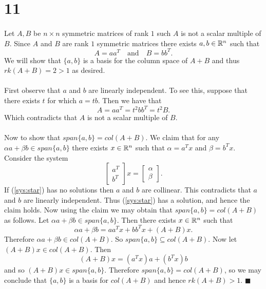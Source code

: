 \documentclass[letterpaper,12pt,oneside,onecolumn]{article}
\begin{document}
\section*{11}
\paragraph{}
Let $A, B$ be $n \times n$ symmetric matrices of rank $1$ such $A$ is not a scalar multiple of $B$. Since $A$ and $B$ are rank $1$ symmetric matrices there exists $a, b \in \mathbb{R}^n$ such that $$A = aa^T \quad \text{and}\quad B = bb^T.$$
We will show that $\{a,b\}$ is a basis for the column space of $A+B$ and thus $rk(A+B) = 2 > 1$ as desired.
\paragraph{}
First observe that $a$ and $b$ are linearly independent. To see this, suppose that there exists $t$ for which $a = tb$. Then we have that $$A = aa^T = t^2bb^T = t^2B.$$
Which contradicts that $A$ is not a scalar multiple of $B$.
\paragraph{}
Now to show that $span\{a,b\} = col(A+B)$. We claim that for any $\alpha a + \beta b \in span \{a,b\}$ there exists $x \in \mathbb{R}^n$ such that $\alpha = a^Tx$ and $\beta = b^Tx$. Consider the system
\begin{equation} \begin{bmatrix} a^T \\b^T\end{bmatrix} x = \begin{bmatrix}\alpha \\ \beta\end{bmatrix}. \label{sys:star}\end{equation}
If (\ref{sys:star}) has no solutions then $a$ and $b$ are collinear. This contradicts that $a$ and $b$ are linearly independent. Thus (\ref{sys:star}) has a solution, and hence the claim holds. Now using the claim we may obtain that $span\{a,b\} = col(A+B)$ as follows. Let $\alpha a + \beta b \in span\{a,b\}$. Then there exists $x \in \mathbb{R}^n$ such that $$\alpha a + \beta b = aa^Tx + bb^Tx + (A+B)x.$$
Therefore $\alpha a + \beta b \in col(A+B)$. So $span\{a,b\} \subseteq col(A+B)$. Now let $(A+B)x \in col(A+B)$. Then $$(A+B)x = (a^Tx)a + (b^Tx)b$$
and so $(A+B)x \in span\{a,b\}.$ Therefore $span\{a,b\} = col(A+B)$, so we may conclude that $\{a,b\}$ is a basis for $col(A+B)$ and hence $rk(A+B) > 1$. $\blacksquare$
\end{document}
